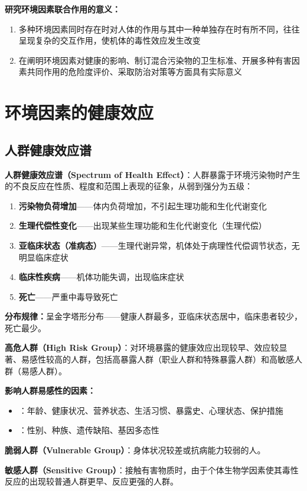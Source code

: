 \begin{tipbox}
\textbf{研究环境因素联合作用的意义：}
\begin{enumerate}[leftmargin=*]
    \item 多种环境因素同时存在时对人体的作用与其中一种单独存在时有所不同，往往呈现复杂的交互作用，使机体的毒性效应发生改变
    \item 在阐明环境因素对健康的影响、制订混合污染物的卫生标准、开展多种有害因素共同作用的危险度评价、采取防治对策等方面具有实际意义
\end{enumerate}
\end{tipbox}

\section{环境因素的健康效应}

\subsection{人群健康效应谱}

\begin{keybox}
\textbf{人群健康效应谱（Spectrum of Health Effect）}：人群暴露于环境污染物时产生的不良反应在性质、程度和范围上表现的征象，从弱到强分为五级：

\begin{enumerate}[leftmargin=*]
    \item \textbf{污染物负荷增加}——体内负荷增加，不引起生理功能和生化代谢变化
    \item \textbf{生理代偿性变化}——出现某些生理功能和生化代谢变化（生理代偿）
    \item \textbf{亚临床状态（准病态）}——生理代谢异常，机体处于病理性代偿调节状态，无明显临床症状
    \item \textbf{临床性疾病}——机体功能失调，出现临床症状
    \item \textbf{死亡}——严重中毒导致死亡
\end{enumerate}

\textbf{分布规律：}呈金字塔形分布——健康人群最多，亚临床状态居中，临床患者较少，死亡最少。
\end{keybox}

\begin{defbox}
\textbf{高危人群（High Risk Group）}：对环境暴露的健康效应出现较早、效应较显著、易感性较高的人群，包括高暴露人群（职业人群和特殊暴露人群）和高敏感人群（易感人群）。

\textbf{影响人群易感性的因素：}
\begin{itemize}[leftmargin=*]
    \item {}：年龄、健康状况、营养状态、生活习惯、暴露史、心理状态、保护措施
    \item {}：性别、种族、遗传缺陷、基因多态性
\end{itemize}

\textbf{脆弱人群（Vulnerable Group）}：身体状况较差或抗病能力较弱的人。

\textbf{敏感人群（Sensitive Group）}：接触有害物质时，由于个体生物学因素使其毒性反应的出现较普通人群更早、反应更强的人群。
\end{defbox}


